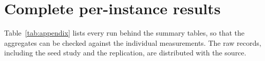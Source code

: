 \documentclass[preprint,12pt]{elsarticle}
\theoremstyle{definition}
\begin{document}


\section{Complete per-instance results}
\label{app:full}

Table~\ref{tab:appendix} lists every run behind the summary tables, so that the
aggregates can be checked against the individual measurements. The raw records,
including the seed study and the replication, are distributed with the source.





\end{document}
